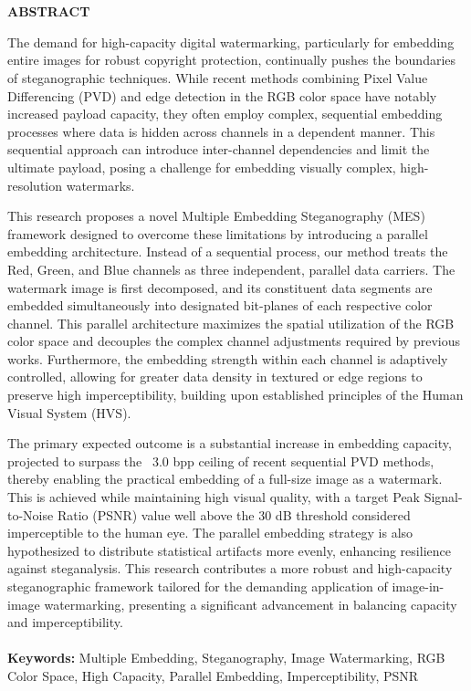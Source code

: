 \chapter*{}
\vspace*{-1.0cm}
\begin{center}
\normalfont\LARGE\textbf{ABSTRACT}
\end{center}
The demand for high-capacity digital watermarking, particularly for embedding entire images for robust copyright protection, continually pushes the boundaries of steganographic techniques. While recent methods combining Pixel Value Differencing (PVD) and edge detection in the RGB color space \cite{liu2025color} have notably increased payload capacity, they often employ complex, sequential embedding processes where data is hidden across channels in a dependent manner. This sequential approach can introduce inter-channel dependencies and limit the ultimate payload, posing a challenge for embedding visually complex, high-resolution watermarks.

This research proposes a novel Multiple Embedding Steganography (MES) framework designed to overcome these limitations by introducing a parallel embedding architecture. Instead of a sequential process, our method treats the Red, Green, and Blue channels as three independent, parallel data carriers. The watermark image is first decomposed, and its constituent data segments are embedded simultaneously into designated bit-planes of each respective color channel. This parallel architecture maximizes the spatial utilization of the RGB color space and decouples the complex channel adjustments required by previous works. Furthermore, the embedding strength within each channel is adaptively controlled, allowing for greater data density in textured or edge regions to preserve high imperceptibility, building upon established principles of the Human Visual System (HVS).

The primary expected outcome is a substantial increase in embedding capacity, projected to surpass the ~3.0 bpp ceiling of recent sequential PVD methods, thereby enabling the practical embedding of a full-size image as a watermark. This is achieved while maintaining high visual quality, with a target Peak Signal-to-Noise Ratio (PSNR) value well above the 30 dB threshold considered imperceptible to the human eye. The parallel embedding strategy is also hypothesized to distribute statistical artifacts more evenly, enhancing resilience against steganalysis. This research contributes a more robust and high-capacity steganographic framework tailored for the demanding application of image-in-image watermarking, presenting a significant advancement in balancing capacity and imperceptibility.\\\\
\textbf{Keywords:} Multiple Embedding, Steganography, Image Watermarking, RGB Color Space, High Capacity, Parallel Embedding, Imperceptibility, PSNR


